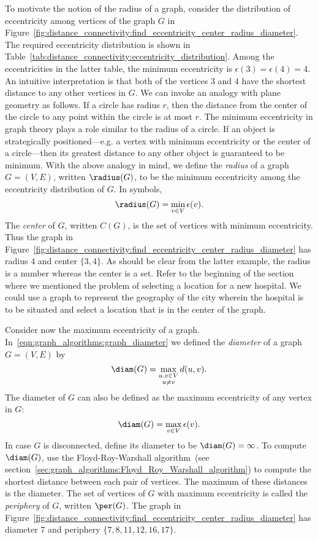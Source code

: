 To motivate the notion of the radius of a graph, consider the
distribution of eccentricity among vertices of the graph $G$ in
Figure~\ref{fig:distance_connectivity:find_eccentricity_center_radius_diameter}.
The required eccentricity distribution is shown in
Table~\ref{tab:distance_connectivity:eccentricity_distribution}. Among
the eccentricities in the latter table, the minimum eccentricity is
$\epsilon(3) = \epsilon(4) = 4$. An intuitive interpretation is that
both of the vertices $3$ and $4$ have the shortest distance to any
other vertices in $G$. We can invoke an analogy with plane geometry as
follows. If a circle has radius $r$, then the distance from the center
of the circle to any point within the circle is at most $r$. The
minimum eccentricity in graph theory plays a role similar to the
radius of a circle. If an object is strategically
positioned---e.g. a vertex with minimum eccentricity or the center of
a circle---then its greatest distance to any other object is
guaranteed to be minimum. With the above analogy in mind, we define
the \emph{radius} of a graph $G = (V,E)$, written
$\radius(G)$, to be the minimum eccentricity among
the eccentricity distribution of $G$. In symbols,
\[
\radius(G)
=
\min_{v \in V} \epsilon(v).
\]
The \emph{center} of $G$, written $C(G)$, is the set of vertices with
minimum eccentricity. Thus the graph in
Figure~\ref{fig:distance_connectivity:find_eccentricity_center_radius_diameter}
has radius $4$ and center $\{3, 4\}$. As should be clear from the
latter example, the radius is a number whereas the center is a
set. Refer to the beginning of the section where we mentioned the
problem of selecting a location for a new hospital. We could use a
graph to represent the geography of the city wherein the hospital is
to be situated and select a location that is in the center of the
graph.

Consider now the maximum eccentricity of a
graph. In~\eqref{eqn:graph_algorithms:graph_diameter} we defined the
\emph{diameter} of a graph $G = (V,E)$ by
\[
\diam(G)\index{$\diam(G)$}
=
\max_{\substack{u,v \in V \\ u \neq v}} d(u,v).
\]
The diameter of $G$ can also be defined as the maximum eccentricity of
any vertex in $G$:
\[
\diam(G)
=
\max_{v \in V} \epsilon(v).
\]
In case $G$ is disconnected, define its diameter to be
$\diam(G) = \infty$. To compute $\diam(G)$, use the Floyd-Roy-Warshall
algorithm~(see
section~\ref{sec:graph_algorithms:Floyd_Roy_Warshall_algorithm}) to
compute the shortest distance between each pair of vertices. The
maximum of these distances is the diameter. The set of vertices of $G$
with maximum eccentricity is called the \emph{periphery} of $G$,
written $\per(G)$. The graph in
Figure~\ref{fig:distance_connectivity:find_eccentricity_center_radius_diameter}
has diameter $7$ and periphery $\{7, 8, 11, 12, 16, 17\}$.

